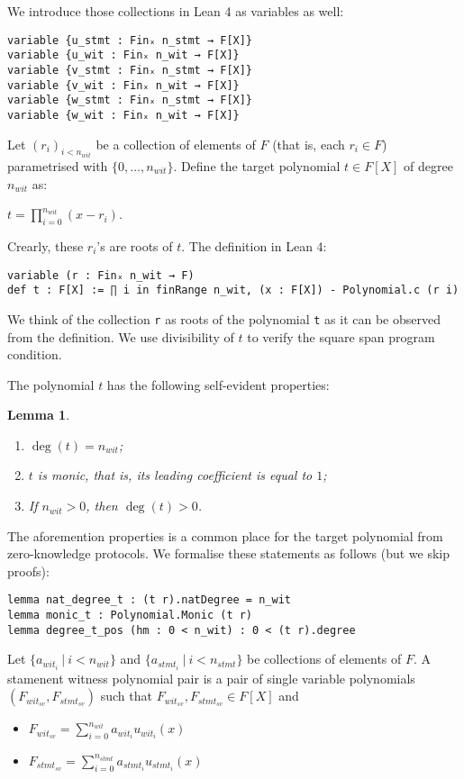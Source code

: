\documentclass{article}
\newtheorem{lemma}{Lemma}
\theoremstyle{definition}
\theoremstyle{remark}
\begin{document}
We introduce those collections in Lean 4 as variables as well:

\begin{lstlisting}
variable {u_stmt : Finₓ n_stmt → F[X]}
variable {u_wit : Finₓ n_wit → F[X]}
variable {v_stmt : Finₓ n_stmt → F[X]}
variable {v_wit : Finₓ n_wit → F[X]}
variable {w_stmt : Finₓ n_stmt → F[X]}
variable {w_wit : Finₓ n_wit → F[X]}
\end{lstlisting}

Let $(r_i)_{i < n_{wit}}$ be a collection of elements of $F$ (that is, each $r_i \in F$) parametrised with $\{0, \dots, n_{wit} \}$.
Define the target polynomial $t \in F[X]$ of degree $n_{wit}$ as:
\begin{center}
$t = \prod \limits_{i = 0}^{n_{wit}} (x - r_i)$.
\end{center}

Crearly, these $r_i$'s are roots of $t$. The definition in Lean 4:
\begin{lstlisting}
variable (r : Finₓ n_wit → F)
def t : F[X] := ∏ i in finRange n_wit, (x : F[X]) - Polynomial.c (r i)
\end{lstlisting}

We think of the collection \verb"r" as roots of the polynomial \verb"t" as it can be observed from the definition.
We use divisibility of $t$ to verify the square span program condition.

The polynomial $t$ has the following self-evident properties:

\begin{lemma}
$ $

\begin{enumerate}
\item $\deg(t) = n_{wit}$;
\item $t$ is monic, that is, its leading coefficient is equal to $1$;
\item If $n_{wit} > 0$, then $\deg(t) > 0$.
\end{enumerate}
\end{lemma}

The aforemention properties is a common place for the target polynomial from zero-knowledge protocols.
We formalise these statements as follows (but we skip proofs):
\begin{lstlisting}
lemma nat_degree_t : (t r).natDegree = n_wit
lemma monic_t : Polynomial.Monic (t r)
lemma degree_t_pos (hm : 0 < n_wit) : 0 < (t r).degree
\end{lstlisting}

Let $\{ a_{{wit}_i} \: | \: i < n_{wit}\}$ and $\{ a_{{stmt}_i} \: | \: i < n_{stmt} \}$ be collections of elements of $F$.
A stamenent witness polynomial pair is a pair of single variable polynomials $(F_{{wit}_{sv}}, F_{{stmt}_{sv}})$
such that $F_{{wit}_{sv}}, F_{{stmt}_{sv}} \in F[X]$ and
\begin{itemize}
\item $F_{{wit}_{sv}} = \sum \limits_{i = 0}^{n_{wit}} a_{{wit}_i} u_{{wit}_{i}}(x)$
\item $F_{{stmt}_{sv}} = \sum \limits_{i = 0}^{n_{stmt}} a_{{stmt}_i} u_{{stmt}_{i}}(x)$
\end{itemize}
\end{document}
